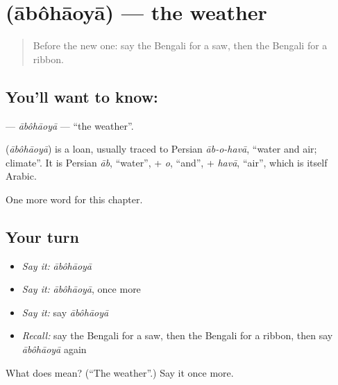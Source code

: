 \section[\texorpdfstring{\bn{আবহাওয়া} (ābôhāoyā)}{আবহাওয়া (ābôhāoyā)}]{ (ābôhāoyā) — the weather}

\label{lesson:BN-C229-abohaoya}



\begin{quote}
Before the new one: say the Bengali for a saw, then the Bengali for a ribbon.
\end{quote}

\subsection*{You'll want to know: }
\textbf{} — \emph{ābôhāoyā} — \textquotedblleft{}the weather\textquotedblright{}.

\begin{cousinweb}
\textbf{} (\emph{ābôhāoyā}) is a loan, usually traced to Persian \emph{āb-o-havā}, \textquotedblleft{}water and air; climate\textquotedblright{}. It is Persian \emph{āb}, \textquotedblleft{}water\textquotedblright{}, + \emph{o}, \textquotedblleft{}and\textquotedblright{}, + \emph{havā}, \textquotedblleft{}air\textquotedblright{}, which is itself Arabic.
\end{cousinweb}

\begin{grammarlens}[title={What you've built}]
One more word for this chapter.
\end{grammarlens}

\subsection*{Your turn}
\begin{itemize}
\raggedright
  \item \emph{Say it:} \emph{ābôhāoyā}
  \item \emph{Say it:} \emph{ābôhāoyā}, once more
  \item \emph{Say it:} say \emph{ābôhāoyā}
  \item \emph{Recall:} say the Bengali for a saw, then the Bengali for a ribbon, then say \emph{ābôhāoyā} again
\end{itemize}

\begin{tcolorbox}[breakable,colback=teal!4,colframe=teal!35!black,title={Before you move on}]
What does  mean? (\textquotedblleft{}The weather\textquotedblright{}.) Say it once more.
\end{tcolorbox}
